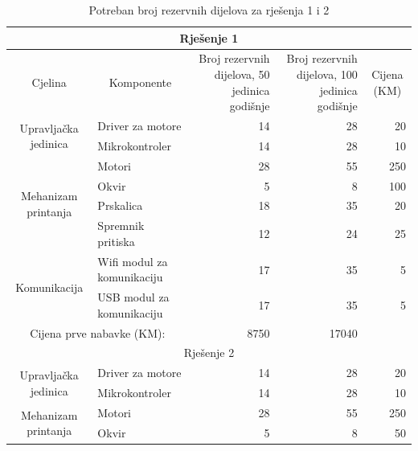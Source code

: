 \documentclass[12pt]{article}
\begin{document}
\begin{landscape}

\begin{table}[htbp]
  \centering
  \caption{Potreban broj rezervnih dijelova za rješenja 1 i 2}
    \begin{tabular}{ccrrr}
    \multicolumn{5}{c}{Rješenje 1} \\
    \midrule
    Cjelina & Komponente & \multicolumn{1}{p{7.93em}}{Broj rezervnih \newline{}dijelova, 50 \newline{}jedinica godišnje} & \multicolumn{1}{p{8.285em}}{Broj rezervnih \newline{}dijelova, 100 \newline{}jedinica godišnje} & \multicolumn{1}{c}{Cijena (KM)} \\
    \midrule
    \multirow{2}[2]{*}{Upravljačka jedinica} & \multicolumn{1}{l}{Driver za motore} & 14    & 28    & 20 \\
          & \multicolumn{1}{l}{Mikrokontroler} & 14    & 28    & 10 \\
    \midrule
    \multirow{4}[2]{*}{Mehanizam printanja} & \multicolumn{1}{l}{Motori} & 28    & 55    & 250 \\
          & \multicolumn{1}{l}{Okvir} & 5     & 8     & 100 \\
          & \multicolumn{1}{l}{Prskalica} & 18    & 35    & 20 \\
          & \multicolumn{1}{l}{Spremnik pritiska} & 12    & 24    & 25 \\
    \midrule
    \multirow{2}[2]{*}{Komunikacija} & \multicolumn{1}{l}{Wifi modul za komunikaciju} & 17    & 35    & 5 \\
          & \multicolumn{1}{l}{USB modul za komunikaciju} & 17    & 35    & 5 \\
    \midrule
    \multicolumn{2}{c}{Cijena prve nabavke (KM):} & 8750  & 17040 &  \\
    \midrule
    \multicolumn{5}{c}{Rješenje 2} \\
    \midrule
    \multirow{2}[2]{*}{Upravljačka jedinica} & \multicolumn{1}{l}{Driver za motore} & 14    & 28    & 20 \\
          & \multicolumn{1}{l}{Mikrokontroler} & 14    & 28    & 10 \\
    \midrule
    \multirow{4}[2]{*}{Mehanizam printanja} & \multicolumn{1}{l}{Motori} & 28    & 55    & 250 \\
          & \multicolumn{1}{l}{Okvir} & 5     & 8     & 50 \\

\end{tabular}
\end{table}
\end{landscape}
\end{document}
